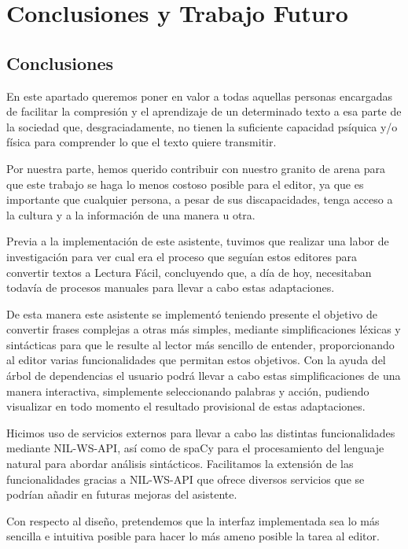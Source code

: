 \chapter{Conclusiones y Trabajo Futuro}
\label{cap:conclusiones}

\section{Conclusiones}
En este apartado queremos poner en valor a todas aquellas personas encargadas de facilitar la compresión y el aprendizaje de un determinado texto a esa parte de la sociedad que, desgraciadamente, no tienen la suficiente capacidad psíquica y/o física para comprender lo que el texto quiere transmitir.

Por nuestra parte, hemos querido contribuir con nuestro granito de arena para que este trabajo se haga lo menos costoso posible para el editor, ya que es importante que cualquier persona, a pesar de sus discapacidades, tenga acceso a la cultura y a la información de una manera u otra.

Previa a la implementación de este asistente, tuvimos que realizar una labor de investigación para ver cual era el proceso que seguían estos editores para convertir textos a Lectura Fácil, concluyendo que, a día de hoy, necesitaban todavía de procesos manuales para llevar a cabo estas adaptaciones.

De esta manera este asistente se implementó teniendo presente el objetivo de convertir frases complejas a otras más simples, mediante simplificaciones léxicas y sintácticas para que le resulte al lector más sencillo de entender, proporcionando al editor varias funcionalidades que permitan estos objetivos. Con la ayuda del árbol de dependencias el usuario podrá llevar a cabo estas simplificaciones de una manera interactiva, simplemente seleccionando palabras y acción, pudiendo visualizar en todo momento el resultado provisional de estas adaptaciones.

Hicimos uso de servicios externos para llevar a cabo las distintas funcionalidades mediante NIL-WS-API, así como de spaCy para el procesamiento del lenguaje natural para abordar análisis sintácticos. Facilitamos la extensión de las funcionalidades gracias a NIL-WS-API que ofrece diversos servicios que se podrían añadir en futuras mejoras del asistente.

Con respecto al diseño, pretendemos que la interfaz implementada sea lo más sencilla e intuitiva posible para hacer lo más ameno posible la tarea al editor.

